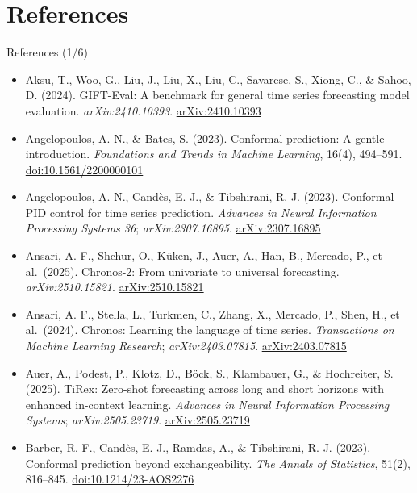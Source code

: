 \section{References}

\begin{frame}{References (1/6)}
\itemsize{\tiny}
\begin{itemize}
    \item Aksu, T., Woo, G., Liu, J., Liu, X., Liu, C., Savarese, S., Xiong, C., \& Sahoo, D. (2024). GIFT-Eval: A benchmark for general time series forecasting model evaluation. \textit{arXiv:2410.10393}. \href{https://arxiv.org/abs/2410.10393}{arXiv:2410.10393}
    \item Angelopoulos, A. N., \& Bates, S. (2023). Conformal prediction: A gentle introduction. \textit{Foundations and Trends in Machine Learning}, 16(4), 494--591. \href{https://doi.org/10.1561/2200000101}{doi:10.1561/2200000101}
    \item Angelopoulos, A. N., Candès, E. J., \& Tibshirani, R. J. (2023). Conformal PID control for time series prediction. \textit{Advances in Neural Information Processing Systems 36}; \textit{arXiv:2307.16895}. \href{https://arxiv.org/abs/2307.16895}{arXiv:2307.16895}
    \item Ansari, A. F., Shchur, O., Küken, J., Auer, A., Han, B., Mercado, P., et al.\ (2025). Chronos-2: From univariate to universal forecasting. \textit{arXiv:2510.15821}. \href{https://arxiv.org/abs/2510.15821}{arXiv:2510.15821}
    \item Ansari, A. F., Stella, L., Turkmen, C., Zhang, X., Mercado, P., Shen, H., et al.\ (2024). Chronos: Learning the language of time series. \textit{Transactions on Machine Learning Research}; \textit{arXiv:2403.07815}. \href{https://arxiv.org/abs/2403.07815}{arXiv:2403.07815}
    \item Auer, A., Podest, P., Klotz, D., Böck, S., Klambauer, G., \& Hochreiter, S. (2025). TiRex: Zero-shot forecasting across long and short horizons with enhanced in-context learning. \textit{Advances in Neural Information Processing Systems}; \textit{arXiv:2505.23719}. \href{https://arxiv.org/abs/2505.23719}{arXiv:2505.23719}
    \item Barber, R. F., Candès, E. J., Ramdas, A., \& Tibshirani, R. J. (2023). Conformal prediction beyond exchangeability. \textit{The Annals of Statistics}, 51(2), 816--845. \href{https://doi.org/10.1214/23-AOS2276}{doi:10.1214/23-AOS2276}

\end{itemize}
\end{frame}
